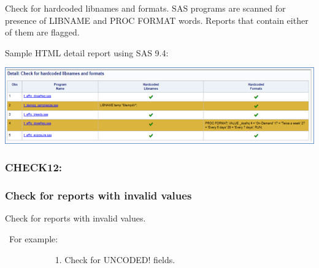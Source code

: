 \documentclass[
  letterpaper,
  DIV=11,
  numbers=noendperiod]{scrartcl}
\begin{document}
Check for hardcoded libnames and formats. SAS programs are scanned for
presence of LIBNAME and PROC FORMAT words. Reports that contain either
of them are flagged.

Sample HTML detail report using SAS 9.4:

\includegraphics{image/Picture13.png}

\hypertarget{check12}{%
\subsubsection{CHECK12:}\label{check12}}

\hypertarget{check-for-reports-with-invalid-values}{%
\subsubsection{Check for reports with invalid
values}\label{check-for-reports-with-invalid-values}}

Check for reports with invalid values.

~For example:

~~~~~~~~~~~ 1. Check for UNCODED! fields.
\end{document}
